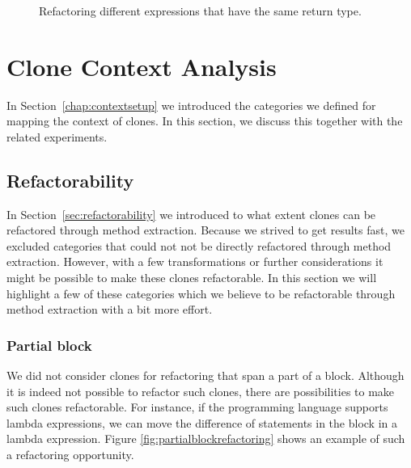 \begin{figure}[H]
\begin{parcolumns}{2}
\end{parcolumns}
\caption{Refactoring different expressions that have the same return type.}
\label{fig:samereturn}
\end{figure}

\section{Clone Context Analysis}
In Section~\ref{chap:contextsetup} we introduced the categories we defined for mapping the context of clones. In this section, we discuss this together with the related experiments.

\subsection{Refactorability} \label{sec:discussrefactorability}
In Section~\ref{sec:refactorability} we introduced to what extent clones can be refactored through method extraction. Because we strived to get results fast, we excluded categories that could not not be directly refactored through method extraction. However, with a few transformations or further considerations it might be possible to make these clones refactorable. In this section we will highlight a few of these categories which we believe to be refactorable through method extraction with a bit more effort.

\subsubsection{Partial block}
We did not consider clones for refactoring that span a part of a block. Although it is indeed not possible to refactor such clones, there are possibilities to make such clones refactorable. For instance, if the programming language supports lambda expressions, we can move the difference of statements in the block in a lambda expression. Figure \ref{fig:partialblockrefactoring} shows an example of such a refactoring opportunity.

